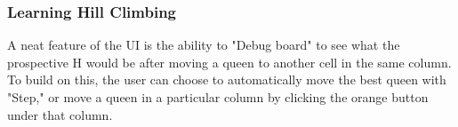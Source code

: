 \subsubsection{Learning Hill Climbing}
A neat feature of the UI is the ability to "Debug board" to see what the prospective H would be after moving a queen to
another cell in the same column. To build on this, the user can choose to automatically move the best queen with "Step,"
or move a queen in a particular column by clicking the orange button under that column.

\subsubsection{}